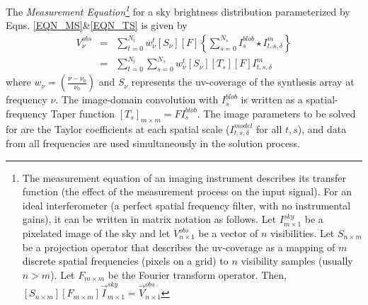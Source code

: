\documentclass[structabstract]{aa}
\newcommand{\dnuno}{{\left(\frac{\nu-\nu_0}{\nu_0}\right)}}
\newcommand{\F}{{F}}
\newcommand{\Fd}{{F^\dag}}
\newcommand{\Gnu}{{G_{\nu}}}
\newcommand{\Sa}{{S}}
\newcommand{\Sna}{{S_{\nu}}}
\newcommand{\wnt}{{w_{\nu}^t}}
\newcommand{\Wnt}{{W^{mfs}_t}}
\newcommand{\Pnu}{{P_{\nu}}}
\begin{document}
The {\it Measurement Equation\footnote
{
The measurement equation of an imaging instrument describes its transfer function (the effect of
the measurement process on the input signal).
For an ideal interferometer (a perfect spatial frequency filter, with no instrumental gains),
it can be written in matrix notation as follows. 
Let $I^{sky}_{m\times 1}$ be a pixelated image of the sky and let $V^{obs}_{n\times 1}$
be a vector of $n$ visibilities. 
Let $S_{n\times m}$ be a projection operator that describes
the uv-coverage as a mapping of $m$ discrete spatial 
frequencies (pixels on a grid) to $n$ visibility samples (usually $n>m$).
Let $F_{m\times m}$ be the Fourier transform operator.
Then, $[{\Sa}_{n\times m}] [F_{m\times m}] \vec{I}^{sky}_{m\times 1} = \vec{V}^{obs}_{n\times 1} $
}
}for a sky brightness distribution parameterized by Eqns.
\ref{EQN_MS}\&\ref{EQN_TS} is given by 
\begin{eqnarray}
V^{obs}_{\nu} &=& \sum_{t=0}^{N_t}\wnt [\Sna][\F] \left\{\sum_{s=0}^{N_s} I^{blob}_s \star I^{m}_{t,s,\delta} \right\} \\
		&=& \sum_{t=0}^{N_t} \sum_{s=0}^{N_s} \wnt [\Sna][T_s] [\F] I^{m}_{t,s,\delta}
\end{eqnarray}
where $w_{\nu} = \dnuno$ and $\Sna$ represents the uv-coverage of the synthesis array at frequency $\nu$.
The image-domain convolution with $I^{blob}_s$ is written as a spatial-frequency
Taper function $[T_s]_{m\times m} = \F I^{blob}_s $. 
The image parameters to be solved for are the Taylor coefficients at each spatial scale
($I^{model}_{t,s,\delta}$ for all $t,s$), and data from all frequencies are used simultaneously
in the solution process.
\end{document}
